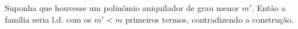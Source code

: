 \documentclass[../main.tex]{subfiles}
\begin{document}
Suponha que houvesse um polinômio aniquilador de grau menor \(m'\). Então a família seria l.d. com os \(m'<m\) primeiros termos, contradizendo a construção.
\end{document}
